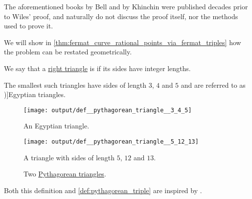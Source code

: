 \begin{remark}
  The aforementioned books by Bell and by Khinchin were published decades prior to Wiles' proof, and naturally do not discuss the proof itself, nor the methods used to prove it.

  We will show in \cref{thm:fermat_curve_rational_points_via_fermat_triples} how the problem can be restated geometrically.
\end{remark}

\begin{definition}\label{def:pythagorean_triangle}
  We say that a \hyperref[def:triangle/right]{right triangle} is  if its sides have integer lengths.

  The smallest such triangles have sides of length \( 3 \), \( 4 \) and \( 5 \) and are referred to as \term[en=Egyptian triangle (\cite[\S 4.3.1]{Deza2012FigurateNumbers})]{Egyptian triangles}.

  \begin{figure}[!ht]
    \begin{subcaptionblock}[t]{0.40\textwidth}
      \centering
      \texttt{[image: output/def\_\_pythagorean\_triangle\_\_3\_4\_5]}
      \caption{An Egyptian triangle.}\label{fig:def:pythagorean_triangle/3_4_5}
    \end{subcaptionblock}
    \hfill
    \begin{subcaptionblock}[t]{0.55\textwidth}
      \centering
      \texttt{[image: output/def\_\_pythagorean\_triangle\_\_5\_12\_13]}
      \caption{A triangle with sides of length \( 5 \), \( 12 \) and \( 13 \).}\label{fig:def:pythagorean_triangle/5_12_13}
    \end{subcaptionblock}
    \caption{Two \hyperref[def:pythagorean_triangle]{Pythagorean triangles}.}\label{fig:def:pythagorean_triangle/basic}
  \end{figure}
\end{definition}
\begin{comments}
  \item Both this definition and \cref{def:pythagorean_triple} are inspired by .
\end{comments}

